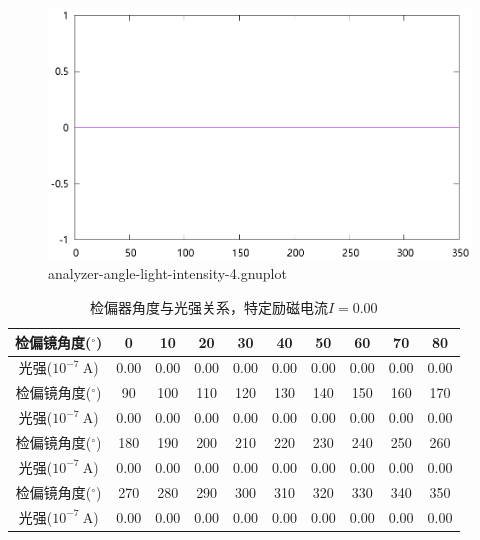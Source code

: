 \documentclass{ctexart}
\newcommand{\si}[1]{\  \mathrm{#1}}
\begin{document}
    \begin{figure}[H]
      \centering
      \includegraphics[width=\linewidth]{../output/analyzer-angle-light-intensity-4.gnuplot}
      \caption{analyzer-angle-light-intensity-4.gnuplot}
      \label{fig:analyzer-angle-light-intensity-4.gnuplot}
    \end{figure}
    \begin{table}[H]
      \centering
      \begin{tabular}{|c|c|c|c|c|c|c|c|c|c|}
        \hline
        检偏镜角度(${}^{\circ}$) & 0 & 10 & 20 & 30 & 40 & 50 & 60 & 70 & 80 \\\hline
        光强($10^{-7} \si{A}$)  & 0.00 & 0.00 & 0.00 & 0.00 & 0.00 & 0.00 & 0.00 & 0.00 & 0.00 \\\hline
        检偏镜角度(${}^{\circ}$) & 90 & 100 & 110 & 120 & 130 & 140 & 150 & 160 & 170 \\\hline
        光强($10^{-7} \si{A}$)  & 0.00 & 0.00 & 0.00 & 0.00 & 0.00 & 0.00 & 0.00 & 0.00 & 0.00  \\\hline
        检偏镜角度(${}^{\circ}$) & 180 & 190 & 200 & 210 & 220 & 230 & 240 & 250 & 260  \\\hline
        光强($10^{-7} \si{A}$)  & 0.00 & 0.00 & 0.00 & 0.00 & 0.00 & 0.00 & 0.00 & 0.00 & 0.00 \\\hline
        检偏镜角度(${}^{\circ}$) & 270 & 280 & 290 & 300 & 310 & 320 & 330 & 340 & 350 \\\hline
        光强($10^{-7} \si{A}$)  & 0.00 & 0.00 & 0.00 & 0.00 & 0.00 & 0.00 & 0.00 & 0.00 & 0.00 \\\hline
      \end{tabular}
      \caption{检偏器角度与光强关系，特定励磁电流$I=0.00$}
    \end{table}
\end{document}
